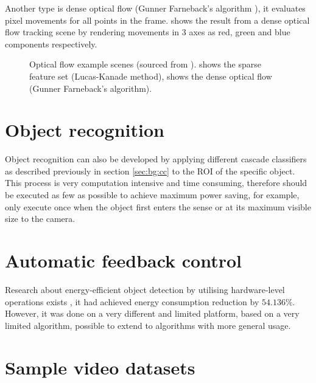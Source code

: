 Another type is dense optical flow (Gunner Farneback's algorithm \cite{farneback2003two}), it evaluates pixel movements for all points in the frame.  shows the result from a dense optical flow tracking scene by rendering movements in 3 axes as red, green and blue components respectively.

\begin{figure}[H]
  \centering
  \caption{Optical flow example scenes (sourced from \cite{opencv:of}).  shows the sparse feature set (Lucas-Kanade method),  shows the dense optical flow (Gunner Farneback's algorithm).}
  \label{bg:of}
\end{figure}



\section{Object recognition}

Object recognition can also be developed by applying different cascade classifiers as described previously in section \ref{sec:bg:cc} to the ROI of the specific object. This process is very computation intensive and time consuming, therefore should be executed as few as possible to achieve maximum power saving, for example, only execute once when the object first enters the sense or at its maximum visible size to the camera.

\section{Automatic feedback control}

Research about energy-efficient object detection by utilising hardware-level operations exists \cite{casares2011energy}, it had achieved energy consumption reduction by $54.136\%$. However, it was done on a very different and limited platform, based on a very limited algorithm, possible to extend to algorithms with more general usage.

\section{Sample video datasets}

